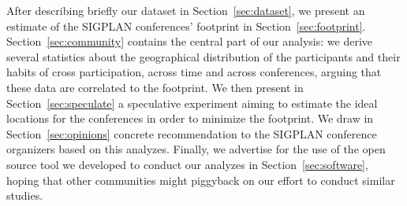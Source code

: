 After describing briefly our dataset in Section~\ref{sec:dataset}, we present an
estimate of the SIGPLAN conferences' footprint in Section~\ref{sec:footprint}.
Section~\ref{sec:community} contains the central part of our analysis: we derive
several statistics about the geographical distribution of the participants and
their habits of cross participation, across time and across conferences, arguing
that these data are correlated to the footprint.
We then present in Section~\ref{sec:speculate} a speculative experiment aiming
to estimate the ideal locations for the conferences in order to minimize the
footprint.
\ifopinions
We draw in Section~\ref{sec:opinions} concrete recommendation to the SIGPLAN
conference organizers based on this analyzes.
\fi
Finally, we advertise for the use of the open source tool we developed to
conduct our analyzes in Section~\ref{sec:software}, hoping that other
communities might piggyback on our effort to conduct similar studies.

